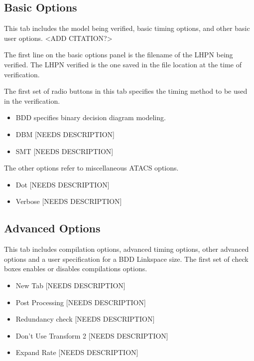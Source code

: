 \documentclass[titlepage,11pt]{article}
\begin{document}
\subsection{\label{basOptions}Basic Options}

\noindent
This tab includes the model being verified, basic timing options, and other
basic user options.
<ADD CITATION?> 

The first line on the basic options panel is the filename of the LHPN being
verified.  The LHPN verified is the one saved in the file location at the time
of verification.

The first set of radio buttons in this tab specifies the
timing method to be used in the verification.
\begin{itemize}
\item BDD specifies binary decision diagram modeling.
\item DBM [NEEDS DESCRIPTION]
\item SMT [NEEDS DESCRIPTION]
\end {itemize}

The other options refer to miscellaneous ATACS options.
\begin {itemize}
\item Dot [NEEDS DESCRIPTION]
\item Verbose [NEEDS DESCRIPTION]
\end {itemize}

\subsection{\label{advOptions}Advanced Options}

\noindent
This tab includes compilation options, advanced timing options, other advanced
options and a user specification for a BDD Linkspace size.  The first set of
check boxes enables or disables compilations options.
\begin{itemize}
\item New Tab [NEEDS DESCRIPTION]
\item Post Processing [NEEDS DESCRIPTION]
\item Redundancy check [NEEDS DESCRIPTION]
\item Don't Use Transform 2 [NEEDS DESCRIPTION]
\item Expand Rate [NEEDS DESCRIPTION]
\end{itemize}
\end{document}
